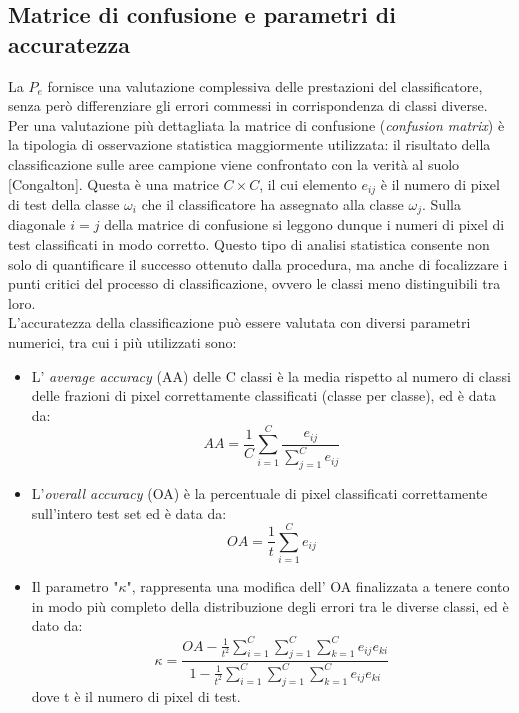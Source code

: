 \subsection{Matrice di confusione e parametri di accuratezza}
La $P_e$ fornisce una valutazione complessiva delle prestazioni del classificatore, senza però differenziare gli errori commessi in corrispondenza di classi diverse. Per una valutazione più dettagliata la matrice di confusione (\emph{confusion matrix}) è la tipologia di osservazione statistica maggiormente utilizzata: il risultato della classificazione sulle aree campione viene confrontato con la verità al suolo [Congalton]. Questa è una matrice $C \times C$, il cui elemento $e_{ij}$ è il numero di pixel di test della classe $\omega_i$ che il classificatore ha assegnato alla classe $\omega_j$. Sulla diagonale $i=j$ della matrice di confusione si leggono dunque i numeri di pixel di test classificati in modo corretto. Questo tipo di analisi statistica consente non solo di quantificare il successo ottenuto dalla procedura, ma anche di focalizzare i punti critici del processo di classificazione, ovvero le classi meno distinguibili tra loro. \\
L'accuratezza della classificazione può essere valutata con diversi parametri numerici, tra cui i più utilizzati sono:
\begin{itemize}
\item L' \emph{average accuracy} (AA) delle C classi è la media rispetto al numero di classi delle frazioni di pixel correttamente classificati (classe per classe), ed è data da:
\begin{equation}
\label{eq:AA}
AA=\dfrac{1}{C}\sum_{i=1}^C\dfrac{e_{ij}}{\sum_{j=1}^C e_{ij}}
\end{equation}
\item L'\emph{overall accuracy }(OA) è la percentuale di pixel classificati correttamente sull'intero test set ed è data da:
\begin{equation}
\label{eq:OA}
OA= \dfrac{1}{t}\sum_{i=1}^C e_{ij}
\end{equation}
\item Il parametro "$\kappa$", rappresenta una modifica dell' OA finalizzata a tenere conto in modo più completo della distribuzione degli errori tra le diverse classi, ed è dato da:
\begin{equation}
\label{eq:K}
\kappa=\dfrac{OA-\frac{1}{t^2}\sum_{i=1}^C\sum_{j=1}^C\sum_{k=1}^C e_{ij}e_{ki}}{1-\frac{1}{t^2}\sum_{i=1}^C\sum_{j=1}^C\sum_{k=1}^C e_{ij} e_{ki}}
\end{equation}
dove t è il numero di pixel di test.
\end{itemize}


